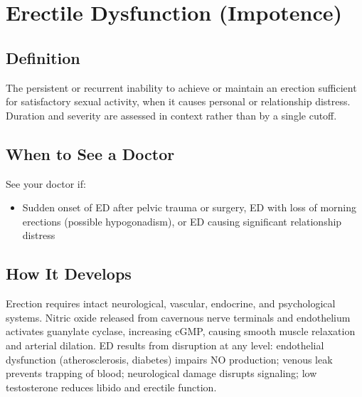\chapter{Erectile Dysfunction (Impotence)}

\section*{Definition}
The persistent or recurrent inability to achieve or maintain an erection sufficient for satisfactory sexual activity, when it causes personal or relationship distress. Duration and severity are assessed in context rather than by a single cutoff.

\section*{When to See a Doctor}
See your doctor if:
\begin{itemize}
  \item Sudden onset of ED after pelvic trauma or surgery, ED with loss of morning erections (possible hypogonadism), or ED causing significant relationship distress
\end{itemize}

\section*{How It Develops}
Erection requires intact neurological, vascular, endocrine, and psychological systems. Nitric oxide released from cavernous nerve terminals and endothelium activates guanylate cyclase, increasing cGMP, causing smooth muscle relaxation and arterial dilation. ED results from disruption at any level: endothelial dysfunction (atherosclerosis, diabetes) impairs NO production; venous leak prevents trapping of blood; neurological damage disrupts signaling; low testosterone reduces libido and erectile function.

